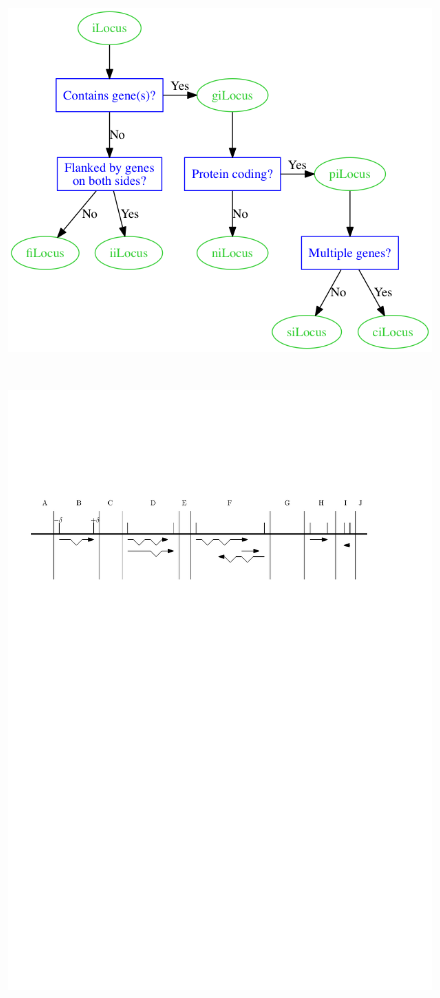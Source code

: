 \begin{figure}[!bht]
\includegraphics[width=6in]{Assets/Graphics/iLoci/ilocus-designations.png}
\centering
\caption{~}
\label{Fig:iLocusDesignations}
\end{figure}

\begin{figure}[!bht]
\includegraphics[width=6in]{Assets/Graphics/iLoci/ilocus-demo.pdf}
\centering
\caption{~}
\label{Fig:iLoci}
\end{figure}

